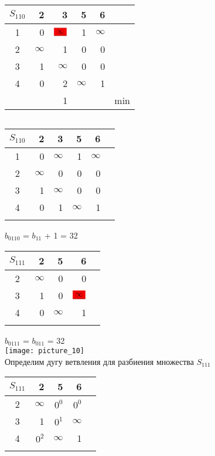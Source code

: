 \documentclass[12pt]{article}
\begin{document}
\begin{flushleft}
\begin{tabular}{c||rrrr||c}
$S_{110}$ & 2 & 3 & 5 & 6 & \\
\hline
\hline
1 &  0 & $\colorbox{red}{$\infty$}$  & 1 & $\infty$ & \\
2 &  $\infty$ & 1  & 0 & 0 & \\
3 &  1 & $\infty$  & 0 & 0 & \\
4 &  0 & 2  & $\infty$ & 1 & \\
\hline
\hline
 &  & 1 &  & & min \\
\end{tabular}
$\qquad $
\begin{tabular}{c||rrrr||c}
$S_{110}$ & 2 & 3 & 5 & 6 & \\
\hline
\hline
1 &  0 & $\infty$  & 1 & $\infty$ & \\
2 &  $\infty$ & 0  & 0 & 0 & \\
3 &  1 & $\infty$  & 0 & 0 & \\
4 &  0 & 1  & $\infty$ & 1 & \\
\hline
\hline
 &  &  &  & & \\
\end{tabular}
\end{flushleft}

$b_{0110}$ = $b_{11}$ + 1 = 32\\

\begin{flushleft}
\begin{tabular}{c||rrr||c}
    $S_{111}$ & 2  & 5 & 6 & \\
\hline
\hline
2 &  $\infty$   & 0 & 0 & \\
3 &  1   & 0 & $\colorbox{red}{$\infty$}$ & \\
4 &  0   & $\infty$ & 1 & \\
\hline
\hline
 &  &  &  & \\
\end{tabular}
\end{flushleft}

$b_{0111}$ = $b_{011}$ = 32\\

\texttt{[image: picture\_10]}\\

Определим дугу ветвления для разбиения множества $S_{111}$\\

\begin{flushleft}
\begin{tabular}{c||rrr||c}
 $S_{111}$ & 2  & 5 & 6 & \\
\hline
\hline
2 &  $\infty$   & $0^0$ & $0^0$ & \\
3 &  1   & $0^1$ & $\infty$ & \\
4 &  $0^2$   & $\infty$ & 1 & \\
\hline
\hline
 &  &  &  & \\
\end{tabular}
\end{flushleft}
\end{document}
